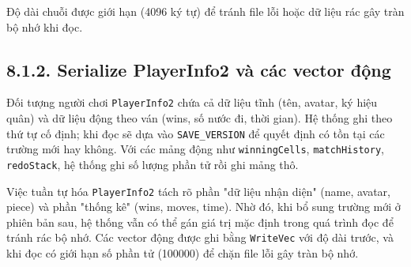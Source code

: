 \setlength{\parindent}{1.5em} Độ dài chuỗi được giới hạn (4096 ký tự) để tránh file lỗi hoặc dữ liệu rác gây tràn bộ nhớ khi đọc.

\subsection*{8.1.2. Serialize PlayerInfo2 và các vector động}

\setlength{\parindent}{1.5em} Đối tượng người chơi \texttt{PlayerInfo2} chứa cả dữ liệu tĩnh (tên, avatar, ký hiệu quân) và dữ liệu động theo ván (wins, số nước đi, thời gian). Hệ thống ghi theo thứ tự cố định; khi đọc sẽ dựa vào \texttt{SAVE\_VERSION} để quyết định có tồn tại các trường mới hay không. Với các mảng động như \texttt{winningCells}, \texttt{matchHistory}, \texttt{redoStack}, hệ thống ghi số lượng phần tử rồi ghi mảng thô.

\setlength{\parindent}{1.5em} Việc tuần tự hóa \texttt{PlayerInfo2} tách rõ phần "dữ liệu nhận diện" (name, avatar, piece) và phần "thống kê" (wins, moves, time). Nhờ đó, khi bổ sung trường mới ở phiên bản sau, hệ thống vẫn có thể gán giá trị mặc định trong quá trình đọc để tránh rác bộ nhớ. Các vector động được ghi bằng \texttt{WriteVec} với độ dài trước, và khi đọc có giới hạn số phần tử (100000) để chặn file lỗi gây tràn bộ nhớ.


